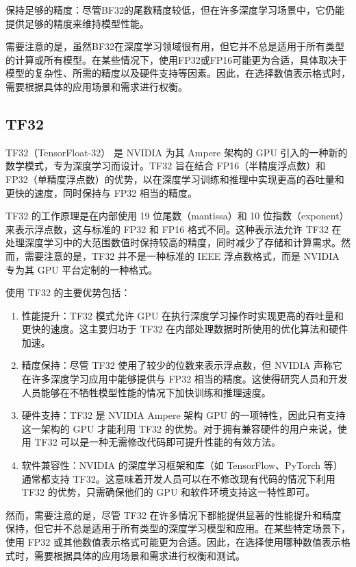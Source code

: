 保持足够的精度：尽管BF32的尾数精度较低，但在许多深度学习场景中，它仍能提供足够的精度来维持模型性能。

需要注意的是，虽然BF32在深度学习领域很有用，但它并不总是适用于所有类型的计算或所有模型。在某些情况下，使用FP32或FP16可能更为合适，具体取决于模型的复杂性、所需的精度以及硬件支持等因素。因此，在选择数值表示格式时，需要根据具体的应用场景和需求进行权衡。

\subsection{TF32}

TF32（TensorFloat-32） 是 NVIDIA 为其 Ampere 架构的 GPU 引入的一种新的数学模式，专为深度学习而设计。TF32 旨在结合 FP16（半精度浮点数）和 FP32（单精度浮点数）的优势，以在深度学习训练和推理中实现更高的吞吐量和更快的速度，同时保持与 FP32 相当的精度。

TF32 的工作原理是在内部使用 19 位尾数（mantissa）和 10 位指数（exponent）来表示浮点数，这与标准的 FP32 和 FP16 格式不同。这种表示法允许 TF32 在处理深度学习中的大范围数值时保持较高的精度，同时减少了存储和计算需求。然而，需要注意的是，TF32 并不是一种标准的 IEEE 浮点数格式，而是 NVIDIA 专为其 GPU 平台定制的一种格式。

使用 TF32 的主要优势包括：

\begin{enumerate}
	\item 性能提升：TF32 模式允许 GPU 在执行深度学习操作时实现更高的吞吐量和更快的速度。这主要归功于 TF32 在内部处理数据时所使用的优化算法和硬件加速。
	\item 精度保持：尽管 TF32 使用了较少的位数来表示浮点数，但 NVIDIA 声称它在许多深度学习应用中能够提供与 FP32 相当的精度。这使得研究人员和开发人员能够在不牺牲模型性能的情况下加快训练和推理速度。
	\item 硬件支持：TF32 是 NVIDIA Ampere 架构 GPU 的一项特性，因此只有支持这一架构的 GPU 才能利用 TF32 的优势。对于拥有兼容硬件的用户来说，使用 TF32 可以是一种无需修改代码即可提升性能的有效方法。
	\item 软件兼容性：NVIDIA 的深度学习框架和库（如 TensorFlow、PyTorch 等）通常都支持 TF32。这意味着开发人员可以在不修改现有代码的情况下利用 TF32 的优势，只需确保他们的 GPU 和软件环境支持这一特性即可。
\end{enumerate}

然而，需要注意的是，尽管 TF32 在许多情况下都能提供显著的性能提升和精度保持，但它并不总是适用于所有类型的深度学习模型和应用。在某些特定场景下，使用 FP32 或其他数值表示格式可能更为合适。因此，在选择使用哪种数值表示格式时，需要根据具体的应用场景和需求进行权衡和测试。

